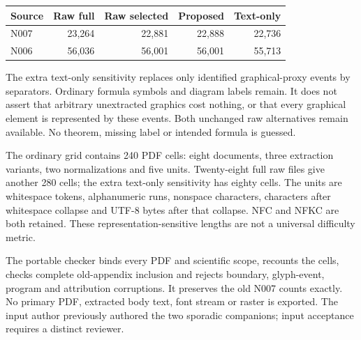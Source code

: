 \documentclass[11pt,a4paper]{article}
\begin{document}
\begin{center}\begin{tabular}{lrrrr}\toprule
Source & Raw full & Raw selected & Proposed & Text-only\\\midrule
N007 & 23,264 & 22,881 & 22,888 & 22,736\\
N006 & 56,036 & 56,001 & 56,001 & 55,713\\
\bottomrule\end{tabular}\end{center}
The extra text-only sensitivity replaces only identified graphical-proxy events by separators. Ordinary formula symbols and diagram labels remain. It does not assert that arbitrary unextracted graphics cost nothing, or that every graphical element is represented by these events. Both unchanged raw alternatives remain available. No theorem, missing label or intended formula is guessed.

The ordinary grid contains 240 PDF cells: eight documents, three extraction variants, two normalizations and five units. Twenty-eight full raw files give another 280 cells; the extra text-only sensitivity has eighty cells. The units are whitespace tokens, alphanumeric runs, nonspace characters, characters after whitespace collapse and UTF-8 bytes after that collapse. NFC and NFKC are both retained. These representation-sensitive lengths are not a universal difficulty metric.

The portable checker binds every PDF and scientific scope, recounts the cells, checks complete old-appendix inclusion and rejects boundary, glyph-event, program and attribution corruptions. It preserves the old N007 counts exactly. No primary PDF, extracted body text, font stream or raster is exported. The input author previously authored the two sporadic companions; input acceptance requires a distinct reviewer.
\end{document}
